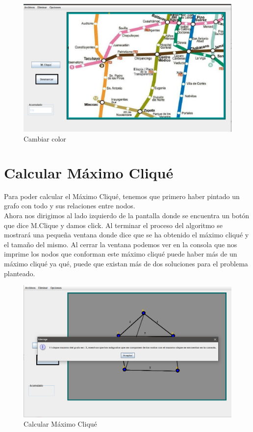 \begin{figure}[h!]
\centering
\includegraphics[scale=.6]{img/mapa.PNG}
\caption{Cambiar color}
\label{Comandos}
\end{figure}

\section{Calcular Máximo Cliqué}
Para poder calcular el Máximo Cliqué, tenemos que primero haber pintado un grafo con todo y sus relaciones entre nodos. 
\\
Ahora nos dirigimos al lado izquierdo de la pantalla donde se encuentra un botón que dice M.Clique y damos click. Al terminar el proceso del algoritmo se mostrará una pequeña ventana donde dice que se ha obtenido el máximo cliqué y el tamaño del mismo. Al cerrar la ventana podemos ver en la consola que nos imprime los nodos que conforman este máximo cliqué puede haber más de un máximo cliqué ya qué, puede que existan más de dos soluciones para el problema planteado.

\begin{figure}[h!]
\centering
\includegraphics[scale=.58]{img/clique.PNG}
\caption{Calcular Máximo Cliqué}
\label{Comandos}
\end{figure}


